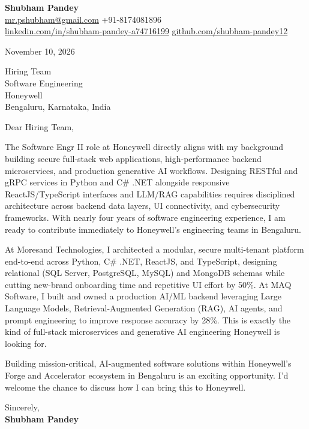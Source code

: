 \documentclass[a4paper,11pt]{article}
\begin{document}
\textbf{\Large Shubham Pandey}\\
\href{mailto:mr.pshubham@gmail.com}{mr.pshubham@gmail.com} \quad +91-8174081896\\
\href{https://www.linkedin.com/in/shubham-pandey-a74716199/}{linkedin.com/in/shubham-pandey-a74716199} \quad
\href{https://github.com/shubham-pandey12}{github.com/shubham-pandey12}

\vspace{1em}
November 10, 2026

\vspace{1em}
Hiring Team\\
Software Engineering\\
Honeywell\\
Bengaluru, Karnataka, India

\vspace{1em}
Dear Hiring Team,

The Software Engr II role at Honeywell directly aligns with my background building secure full-stack web applications, high-performance backend microservices, and production generative AI workflows. Designing RESTful and gRPC services in Python and C\# .NET alongside responsive ReactJS/TypeScript interfaces and LLM/RAG capabilities requires disciplined architecture across backend data layers, UI connectivity, and cybersecurity frameworks. With nearly four years of software engineering experience, I am ready to contribute immediately to Honeywell's engineering teams in Bengaluru.

At Moresand Technologies, I architected a modular, secure multi-tenant platform end-to-end across Python, C\# .NET, ReactJS, and TypeScript, designing relational (SQL Server, PostgreSQL, MySQL) and MongoDB schemas while cutting new-brand onboarding time and repetitive UI effort by 50\%. At MAQ Software, I built and owned a production AI/ML backend leveraging Large Language Models, Retrieval-Augmented Generation (RAG), AI agents, and prompt engineering to improve response accuracy by 28\%. This is exactly the kind of full-stack microservices and generative AI engineering Honeywell is looking for.

Building mission-critical, AI-augmented software solutions within Honeywell's Forge and Accelerator ecosystem in Bengaluru is an exciting opportunity. I'd welcome the chance to discuss how I can bring this to Honeywell.

\vspace{1em}
Sincerely,\\[0.5em]
\textbf{Shubham Pandey}
\end{document}
